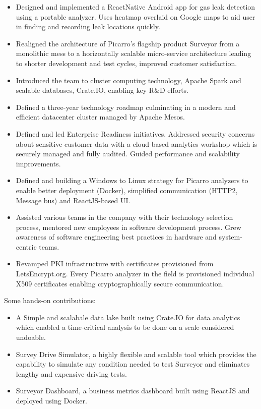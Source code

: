 \documentclass[a4paper, 13pt,line]{article}
\begin{document}
\bigskip
\begin{itemize}
\item Designed and implemented a ReactNative Android app for gas leak
  detection using a portable analyzer. Uses heatmap overlaid on Google
  maps to aid user in finding and recording leak locations quickly.
\item Realigned the architecture of Picarro's flagship product
  Surveyor from a monolithic mess to a horizontally scalable
  micro-service architecture leading to shorter development and
  test cycles, improved customer satisfaction.
\item Introduced the team to cluster computing technology, Apache
  Spark and scalable databases, Crate.IO, enabling key R\&D
  efforts.
\item Defined a three-year technology roadmap culminating in a modern
  and efficient datacenter cluster managed by Apache Mesos.
\item Defined and led Enterprise Readiness initiatives. Addressed
  security concerns about sensitive customer data with a cloud-based
  analytics workshop which is securely managed and fully
  audited. Guided performance and scalability improvements.
\item Defined and building a Windows to Linux strategy for Picarro
  analyzers to enable better deployment (Docker), simplified
  communication (HTTP2, Message bus) and ReactJS-based UI.
\item Assisted various teams in the company with their technology
  selection process, mentored new employees in software development
  process. Grew awareness of software engineering best practices in
  hardware and system-centric teams.
\item Revamped PKI infrastructure with certificates provisioned from
  LetsEncrypt.org. Every Picarro analyzer in the field is provisioned
  individual X509 certificates enabling cryptographically secure
  communication.
\end{itemize}

\bigskip\noindent Some hands-on contributions:
\begin{itemize}
\item A Simple and scalabale data lake built using Crate.IO for data
  analytics which enabled a time-critical analysis to be done on a
  scale considered undoable.
\item Survey Drive Simulator, a highly flexible and scalable tool
  which provides the capability to simulate any condition needed to
  test Surveyor and eliminates lengthy and expensive driving tests.
\item Surveyor Dashboard, a business metrics dashboard built using
  ReactJS and deployed using Docker.
\end{itemize}
\end{document}
